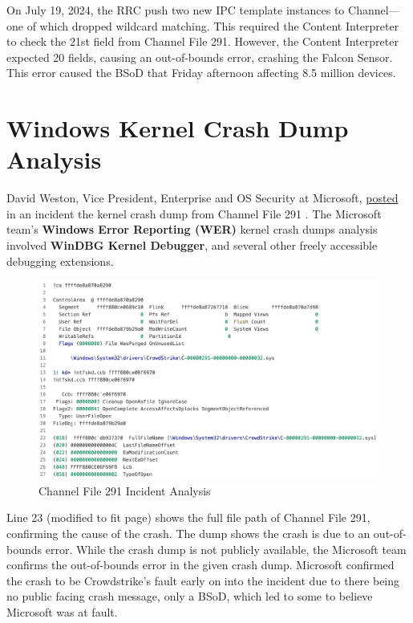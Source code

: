 On July 19, 2024, the RRC push two new IPC template instances to Channel---one of which dropped wildcard matching.
This required the Content Interpreter to check the 21st field from Channel File 291. However, the Content Interpreter
expected 20 fields, causing an out-of-bounds error, crashing the Falcon Sensor. This error
caused the BSoD that Friday afternoon affecting 8.5 million devices.

\section{Windows Kernel Crash Dump Analysis}

David Weston, Vice President, Enterprise and OS Security at Microsoft, \href{https://www.microsoft.com/en-us/security/blog/2024/07/27/windows-security-best-practices-for-integrating-and-managing-security-tools/}{posted} in an incident
the kernel crash dump from Channel File 291 \cite{weston_windows_security_2024}. The Microsoft team's \textbf{Windows Error Reporting (WER)}
kernel crash dumps analysis involved \textbf{WinDBG Kernel Debugger}, and several other freely accessible debugging extensions.

\begin{figure}[h!]
    \centering
    \includegraphics[width=1\textwidth]{Sections/crowd/fig1.png}
    \caption{Channel File 291 Incident Analysis}
    \label{fig:fig1}
\end{figure}

\noindent

\noindent
Line 23 (modified to fit page) shows the full file path of Channel File 291, confirming the cause of the crash.
The dump shows the crash is due to an out-of-bounds error.
While the crash dump is not publicly available, the Microsoft team confirms the out-of-bounds error in the given crash dump.
Microsoft confirmed the crash to be Crowdstrike's fault early on into the incident due to there being no public facing crash message, only a BSoD, which led to some to believe Microsoft was at fault.

